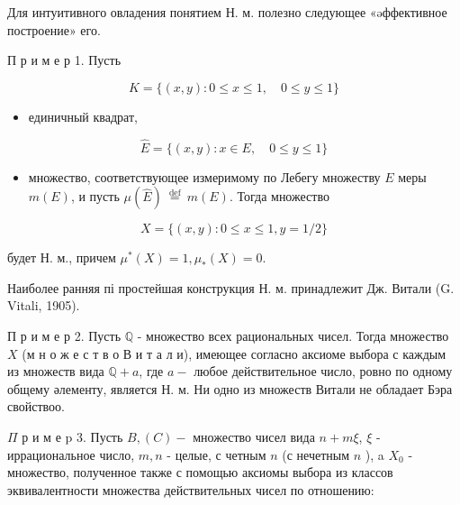 \documentclass[10pt]{article}
\begin{document}
Для интуитивного овладения понятием Н. м. полезно следующее «əффективное построение» его.



П р и м е р 1. Пусть



\[

K=\{(x, y): 0 \leqslant x \leqslant 1, \quad 0 \leqslant y \leqslant 1\}

\]



\begin{itemize}

  \item единичный квадрат,

\end{itemize}



\[

\widehat{E}=\{(x, y): x \in E, \quad 0 \leqslant y \leqslant 1\}

\]



\begin{itemize}

  \item множество, соответствующее измеримому по Лебегу множеству $E$ меры $m(E)$, и пусть $\mu(\widehat{E}) \stackrel{\text { def }}{=} m(E)$. Тогда множество

\end{itemize}



\[

X=\{(x, y): 0 \leqslant x \leqslant 1, y=1 / 2\}

\]



будет Н. м., причем $\mu^{*}(X)=1, \mu_{*}(X)=0$.



Наиболее ранняя пі простейшая конструкция Н. м. принадлежит Дж. Витали (G. Vitali, 1905).



П р и м е р 2. Пусть $\mathbb{Q}$ - множество всех рациональных чисел. Тогда множество $X$ (м н о ж е с т в о В и т а л и), имеющее согласно аксиоме выбора с каждым из множеств вида $\mathbb{Q}+a$, где $a-$ любое действительное число, ровно по одному общему әлементу, является Н. м. Ни одно из множеств Витали не обладает Бэра свойствоо.



$\Pi$ р и м е p 3. Пусть $B,(C)-$ множество чисел вида $n+m \xi$, $\xi$ - иррациональное число, $m, n$ - целые, с четным $n$ (с нечетным $n$ ), a $X_{0}$ - множество, полученное также с помощью аксиомы выбора из классов эквивалентности множества действительных чисел по отношению:
\end{document}
